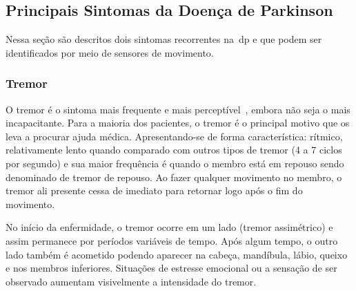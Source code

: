 \subsection{Principais Sintomas da Doença de Parkinson}
Nessa seção são descritos dois sintomas recorrentes na~\ac{dp} e que podem ser identificados por meio de sensores de movimento.

%

\subsubsection{Tremor}
O tremor é o sintoma mais frequente e mais perceptível~\cite{limongi2002}, embora não seja o mais incapacitante. Para a maioria dos pacientes, o tremor é o principal motivo que os leva a procurar ajuda médica. Apresentando-se de forma característica: rítmico, relativamente lento quando comparado com outros tipos de tremor (4 a 7 ciclos por segundo) e sua maior frequência é quando o membro está em repouso sendo denominado de tremor de repouso. Ao fazer qualquer movimento no membro, o tremor ali presente cessa de imediato para retornar logo após o fim do movimento.

No início da enfermidade, o tremor ocorre em um lado (tremor assimétrico) e assim permanece por períodos variáveis de tempo. Após algum tempo, o outro lado também é acometido podendo aparecer na cabeça, mandíbula, lábio, queixo e nos membros inferiores.  Situações de estresse emocional ou a sensação de ser observado aumentam visivelmente a intensidade do tremor. 


